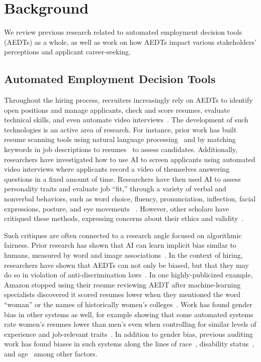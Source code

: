 \section{Background}
\label{sec:background}

We review previous research related to automated employment decision tools (AEDTs) as a whole, as well as work on how AEDTs impact various stakeholders' perceptions and applicant career-seeking. 

\subsection{Automated Employment Decision Tools}
Throughout the hiring process, recruiters increasingly rely on AEDTs to identify open positions and manage applicants, check and score resumes, evaluate technical skills, and even automate video interviews~\cite{bogen2018help, sanchez2020does}. The development of such technologies is an active area of research. For instance, prior work has built resume scanning tools using natural language processing~\cite{sanyal2017resume, harsha2022automated, bharadwaj2022resume} and by matching keywords in job descriptions to resumes~\cite{dhende2018candidate, satheesh2020resume} to assess candidates. Additionally, researchers have investigated how to use AI to screen applicants using automated video interviews where applicants record a video of themselves answering questions in a fixed amount of time. Researchers have then used AI to assess personality traits and evaluate job ``fit,'' through a variety of verbal and nonverbal behaviors, such as word choice, fluency, pronunciation, inflection, facial expressions, posture, and eye movements ~\cite{chen2016automated, naim2016automated, hickman2022automated}. However, other scholars have critiqued these methods, expressing concerns about their ethics and validity~\cite{roemmich2023values, rhea2022resume}. 

Such critiques are often connected to a research angle focused on algorithmic fairness. Prior research has shown that AI can learn implicit bias similar to humans, measured by word and image associations~\cite{caliskan2017semantics}. In the context of hiring, researchers have shown that AEDTs can not only be biased, but that they may do so in violation of anti-discrimination laws~\cite{ajunwa2019auditing, sanchez2020does, raghavan2020mitigating}. In one highly-publicized example, Amazon stopped using their resume reviewing AEDT after machine-learning specialists discovered it scored resumes lower when they mentioned the word ``woman'' or the names of historically women's colleges~\cite{dastin2018amazon}. Work has found gender bias in other systems as well, for example showing that some automated systems rate women's resumes lower than men's even when controlling for similar levels of experience and job-relevant traits~\cite{parasurama2022gendered, chen2018investigating}. In addition to gender bias, previous auditing work has found biases in such systems along the lines of race~\cite{ajunwa2019auditing}, disability status~\cite{buyl2022tackling}, and age~\cite{farber2017factors} among other factors. 

